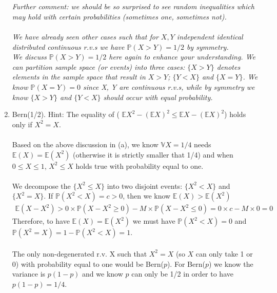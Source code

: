 \begin{exercise}[BH.5.51]
\begin{solution}
\begin{enumerate}
    	~\\~\\ \textit{Further comment: we should be so surprised to see random inequalities which may hold with certain probabilities (sometimes one, sometimes not). \\
    		~\\	
    		We have already seen other cases such that for $X,Y$ independent identical distributed continuous r.v.s we have $\mathbb{P}(X>Y)=1/2$ by symmetry. 
    		~\\ We discuss $\mathbb{P}(X>Y)=1/2$ here again to enhance your understanding. We can partition sample space (or events) into three cases: $\{X>Y\}$ denotes elements in the sample space that result in $X>Y$; $\{Y<X\}$ and $\{X=Y\}$. We know $\mathbb{P}(X=Y)=0$ since X, Y are continuous r.v.s, while by symmetry we know $\{X>Y\}$ and $\{Y<X\}$ should occur with equal probability.}  
    	\item Bern(1/2). Hint: The equality of ( $\mathbb{E}X^2-(\mathbb{E}X)^2\leq \mathbb{E}X-(\mathbb{E}X)^2$) holds only if $X^2=X$.\\~\\
    	Based on the above discussion in (a),  we know $\mathbb{V}X=1/4$ needs $\mathbb{E}(X)=\mathbb{E}(X^2)$ (otherwise it is strictly smaller that 1/4) and  when $0\leq X \leq 1$, $X^2\leq X$ holds true with probability equal to one.\\ ~\\
    	We decompose the $\{X^2 \leq X\}$ into two disjoint events: $\{X^2 < X\}$ and $\{X^2 = X\}$. If $\mathbb{P}(X^2< X)=c> 0$, then we know $\mathbb{E}(X)>\mathbb{E}(X^2)$
    	\begin{align*}
    		\mathbb{E}(X-X^2) > 0 \times  \mathbb{P}( X-X^2\geq 0) - M \times  \mathbb{P}( X-X^2\leq 0)=0\times c-M\times 0=0 
    	\end{align*}
    	Therefore, to have $\mathbb{E}(X)=\mathbb{E}(X^2)$ we must have $\mathbb{P}(X^2<X)=0$ and $\mathbb{P}(X^2= X)=1-\mathbb{P}(X^2< X)=1$.\\~\\ 
    	The only non-degenerated r.v. X such that $X^2=X$ (so $X$ can only take 1 or 0) with probability equal to one would be Bern($p$). For Bern($p$) we know the variance is $p(1-p)$ and we know $p$ can only be 1/2 in order to have $p(1-p)=1/4$.
	\end{enumerate}
\end{solution}
\end{exercise}


